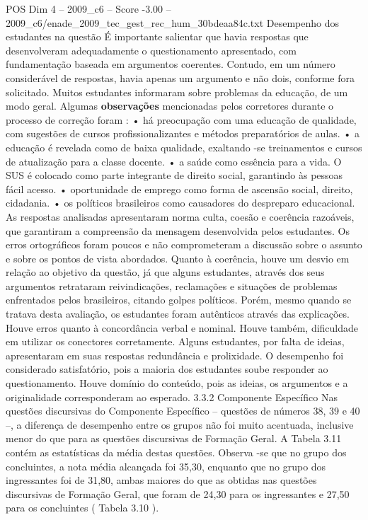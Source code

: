 \begin{textsample}{POS Dim 4 – 2009\_c6 – Score -3.00 – 2009\_c6/enade\_2009\_tec\_gest\_rec\_hum\_30bdeaa84c.txt}
Desempenho dos estudantes na questão É importante salientar que havia respostas que desenvolveram adequadamente o questionamento apresentado, com fundamentação baseada em argumentos coerentes.
Contudo, em um número considerável de respostas, havia apenas um argumento e não dois, conforme fora solicitado.
Muitos estudantes informaram sobre problemas da educação, de um modo geral.
Algumas \textbf{observações} mencionadas pelos corretores durante o processo de correção foram : • há preocupação com uma educação de qualidade, com sugestões de cursos profissionalizantes e métodos preparatórios de aulas. • a educação é revelada como de baixa qualidade, exaltando -se treinamentos e cursos de atualização para a classe docente. • a saúde como essência para a vida.
O SUS é colocado como parte integrante de direito social, garantindo às pessoas fácil acesso. • oportunidade de emprego como forma de ascensão social, direito, cidadania. • os políticos brasileiros como causadores do despreparo educacional.
As respostas analisadas apresentaram norma culta, coesão e coerência razoáveis, que garantiram a compreensão da mensagem desenvolvida pelos estudantes.
Os erros ortográficos foram poucos e não comprometeram a discussão sobre o assunto e sobre os pontos de vista abordados.
Quanto à coerência, houve um desvio em relação ao objetivo da questão, já que alguns estudantes, através dos seus argumentos retrataram reivindicações, reclamações e situações de problemas enfrentados pelos brasileiros, citando golpes políticos.
Porém, mesmo quando se tratava desta avaliação, os estudantes foram autênticos através das explicações.
Houve erros quanto à concordância verbal e nominal.
Houve também, dificuldade em utilizar os conectores corretamente.
Alguns estudantes, por falta de ideias, apresentaram em suas respostas redundância e prolixidade.
O desempenho foi considerado satisfatório, pois a maioria dos estudantes soube responder ao questionamento.
Houve domínio do conteúdo, pois as ideias, os argumentos e a originalidade corresponderam ao esperado. 3.3.2 Componente Específico Nas questões discursivas do Componente Específico – questões de números 38, 39 e 40 –, a diferença de desempenho entre os grupos não foi muito acentuada, inclusive menor do que para as questões discursivas de Formação Geral.
A Tabela 3.11 contém as estatísticas da média destas questões.
Observa -se que no grupo dos concluintes, a nota média alcançada foi 35,30, enquanto que no grupo dos ingressantes foi de 31,80, ambas maiores do que as obtidas nas questões discursivas de Formação Geral, que foram de 24,30 para os ingressantes e 27,50 para os concluintes ( Tabela 3.10 ).

\end{textsample}
